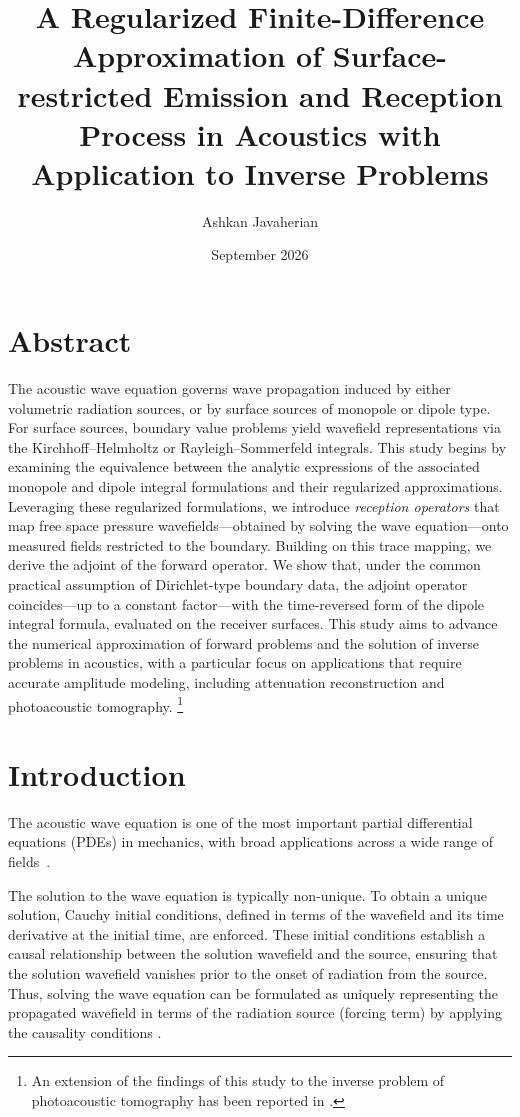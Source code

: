 \documentclass[11pt,reqno]{amsart}
\title[]
{A Regularized Finite-Difference Approximation of Surface-restricted Emission and Reception Process in Acoustics with Application to Inverse Problems}
\author{Ashkan Javaherian}
\date{September 2026}
\theoremstyle{remark}
\theoremstyle{italic_lemma}
\begin{document}
\maketitle


\section*{Abstract} 
\noindent
The acoustic wave equation governs wave propagation induced by either volumetric radiation sources, or by surface sources of monopole or dipole type. For surface sources, boundary value problems yield wavefield representations via the Kirchhoff–Helmholtz or Rayleigh–Sommerfeld integrals. This study begins by examining the equivalence between the analytic expressions of the associated monopole and dipole integral formulations and their regularized approximations. Leveraging these regularized formulations, we introduce \emph{reception operators} that map free space pressure wavefields—obtained by solving the wave equation—onto measured fields restricted to the boundary. Building on this trace mapping, we derive the adjoint of the forward operator. We show that, under the common practical assumption of Dirichlet-type boundary data, the adjoint operator coincides—up to a constant factor—with the time-reversed form of the dipole integral formula, evaluated on the receiver surfaces. This study aims to advance the numerical approximation of forward problems and the solution of inverse problems in acoustics, with a particular focus on applications that require accurate amplitude modeling, including attenuation reconstruction and photoacoustic tomography. \footnote{An extension of the findings of this study to the inverse problem of photoacoustic tomography has been reported in \cite{Javaherian10}.}




\section{Introduction}
\noindent
The acoustic wave equation is one of the most important partial differential equations (PDEs) in mechanics, with broad applications across a wide range of fields~\cite{Mast,Tabei,Treeby,Bilbao,Bencomo,Borcea,Kaltenbacher}.



The solution to the wave equation is typically non-unique. To obtain a unique solution, Cauchy initial conditions, defined in terms of the wavefield and its time derivative at the initial time, are enforced. These initial conditions establish a causal relationship between the solution wavefield and the source, ensuring that the solution wavefield vanishes prior to the onset of radiation from the source. Thus, solving the wave equation can be formulated as uniquely representing the propagated wavefield in terms of the radiation source (forcing term) by applying the causality conditions \cite{Devaney}.
\end{document}

